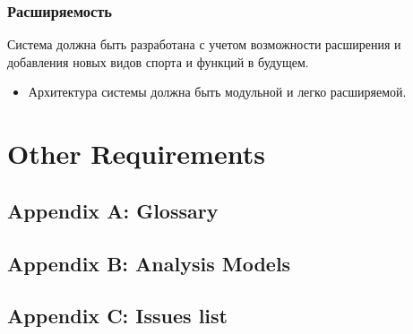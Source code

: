 \documentclass{scrreprt}
\begin{document}
\subsection{Расширяемость}
Система должна быть разработана с учетом возможности расширения и добавления новых видов спорта и функций в будущем.
\begin{itemize}
    \item Архитектура системы должна быть модульной и легко расширяемой.
\end{itemize}

\chapter{Other Requirements}

\section{Appendix A: Glossary}

\section{Appendix B: Analysis Models}

\section{Appendix C: Issues list}
\end{document}

